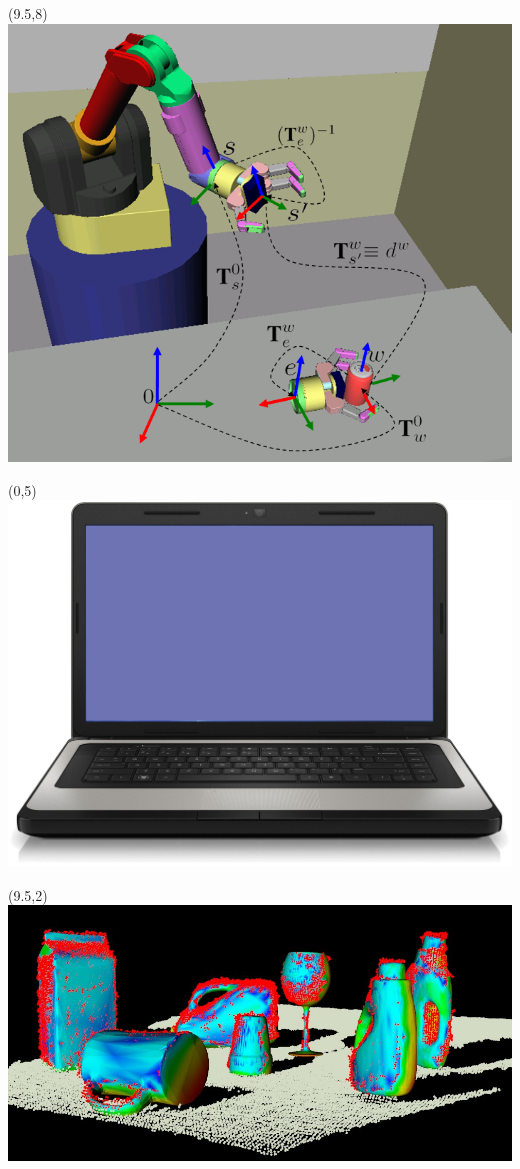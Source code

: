 \documentclass{beamer}
\begin{document}
\begin{frame}[plain]{}
\begin{textblock}{5}
           \end{textblock} 
                \begin{textblock}{5}(9.5,8)
                    \includegraphics[width=1.2\linewidth]{figures/pick_and_place.png}
                 \end{textblock}           
           \begin{textblock}{5}(0,5)
               \includegraphics[width=0.6\linewidth]{figures/laptop.png}
           \end{textblock}                      
           \begin{textblock}{5}(9.5,2)
               \includegraphics[width=1.0\linewidth]{figures/object_recognition.jpg}
              \end{textblock}       
       \end{frame} 
       
\end{document}
